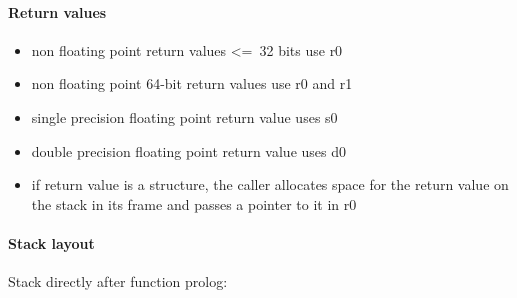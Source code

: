 \paragraph{Return values}
\begin{itemize}
\item non floating point return values \textless=\ 32 bits use r0
\item non floating point 64-bit return values use r0 and r1
\item single precision floating point return value uses s0
\item double precision floating point return value uses d0
\item if return value is a structure, the caller allocates space for the return value on the stack in its frame and passes a pointer to it in r0
\end{itemize}

\paragraph{Stack layout}

Stack directly after function prolog:\\

